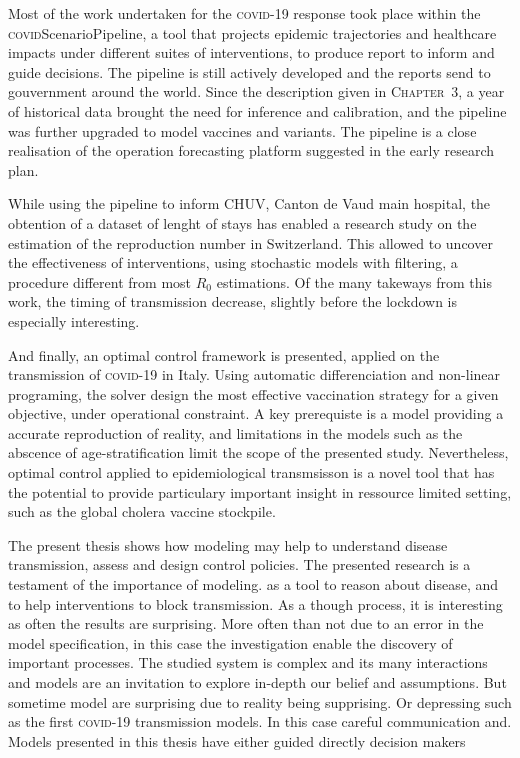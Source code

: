 Most of the work undertaken for the \textsc{covid}-19 response took place within the \textsc{covid}ScenarioPipeline, a tool that projects epidemic trajectories and healthcare impacts under different suites of interventions, to produce report to inform and guide decisions. The pipeline is still actively developed and the reports send to gouvernment around the world. Since the description given in \textsc{Chapter~3}, a year of historical data brought the need for inference and calibration, and the pipeline was further upgraded to model vaccines and variants. The pipeline is a close realisation of the operation forecasting platform suggested in the early research plan.

While using the pipeline to inform CHUV, Canton de Vaud main hospital, the obtention of a dataset of lenght of stays has enabled a research study on the estimation of the reproduction number in Switzerland. This allowed to uncover the effectiveness of interventions, using stochastic models with filtering, a procedure different from most $R_0$ estimations. Of the many takeways from this work, the timing of transmission decrease, slightly before the lockdown is especially interesting.

And finally, an optimal control framework is presented, applied on the transmission of \textsc{covid}-19 in Italy. Using automatic differenciation and non-linear programing, the solver design the most effective vaccination strategy for a given objective, under operational constraint. A key prerequiste is a model providing a accurate reproduction of reality, and limitations in the models such as the abscence of age-stratification limit the scope of the presented study. Nevertheless, optimal control applied to epidemiological transmsisson is a novel tool that has the potential to provide particulary important  insight in ressource limited setting, such as the global cholera vaccine stockpile.

The present thesis shows how modeling may help to understand disease transmission, assess and design control policies.
 The presented research is a testament of the importance of modeling. as a tool to reason about disease, and to help interventions to block transmission. As a though process, it is interesting as often the results are surprising. More often than not due to an error in the model specification, in this case the investigation enable the discovery of important processes. The studied system is complex and its many interactions and models are an invitation to explore in-depth our belief and assumptions. But sometime model are surprising due to reality being supprising. Or depressing such as the first \textsc{covid}-19 transmission models. In this case careful communication and. Models presented in this thesis have either guided directly decision makers
 
